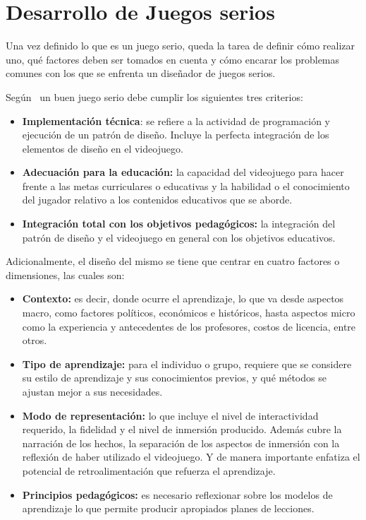 \section{Desarrollo de Juegos serios}
\label{sec:desarrollo}

Una vez definido lo que es un juego serio, queda la tarea de definir cómo
realizar uno, qué factores deben ser tomados en cuenta y cómo encarar los
problemas comunes con los que se enfrenta un diseñador de juegos serios.

Según~\cite{education:games} un buen juego serio debe cumplir los siguientes
tres criterios:

\begin{itemize}

\item \textbf{Implementación técnica}: se refiere a la actividad de programación
    y ejecución de un patrón de diseño. Incluye la perfecta integración de los
    elementos de diseño en el videojuego. 

\item \textbf{Adecuación para la educación:} la capacidad del videojuego para hacer
    frente a las metas curriculares o educativas y la habilidad o el
    conocimiento del jugador relativo a los contenidos educativos que se aborde.

\item \textbf{Integración total con los objetivos pedagógicos:} la integración
    del patrón de diseño y el videojuego en general con los objetivos
    educativos.

\end{itemize}


Adicionalmente, el diseño del mismo se tiene que centrar en cuatro factores o
dimensiones, las cuales son\cite{education:games}:

\begin{itemize}
\item \textbf{Contexto:} es decir, donde ocurre el aprendizaje, lo que va desde
    aspectos macro, como  factores políticos, económicos e históricos, hasta
    aspectos micro como la experiencia y  antecedentes de los profesores, costos
    de licencia, entre otros.
\item \textbf{Tipo de aprendizaje:} para el individuo o grupo, requiere que se
    considere su  estilo de aprendizaje y sus conocimientos previos, y qué
    métodos se ajustan mejor a sus  necesidades.
\item \textbf{Modo de representación:} lo que incluye el nivel de interactividad
    requerido, la fidelidad y  el nivel de inmersión producido. Además cubre la
    narración de los hechos, la separación de los  aspectos de inmersión con la
    reflexión de haber utilizado el videojuego. Y de manera importante  enfatiza
    el potencial de retroalimentación que refuerza el aprendizaje.
\item \textbf{Principios pedagógicos:} es necesario reflexionar sobre los
    modelos de aprendizaje lo  que permite producir apropiados planes de
    lecciones.
\end{itemize}

